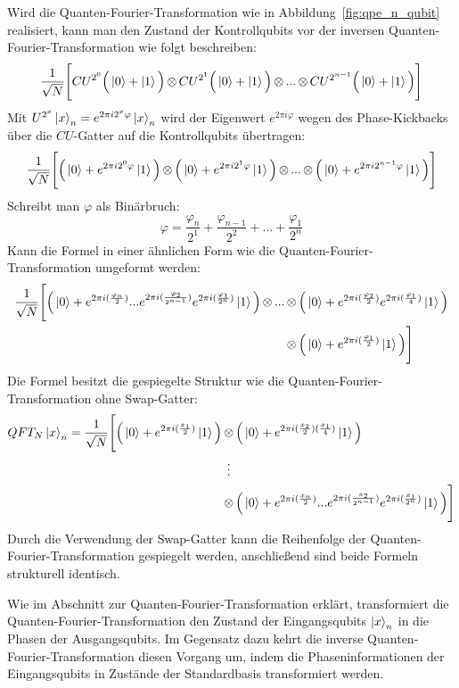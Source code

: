 Wird die Quanten-Fourier-Transformation wie in Abbildung~\ref{fig:qpe_n_qubit} realisiert,
kann man den Zustand der Kontrollqubits vor der inversen Quanten-Fourier-Transformation wie folgt beschreiben:
\[\frac{1}{\sqrt{N}}\Bigg[
  CU^{2^0}\Big(\ket{0} + \ket{1}\Big) \operatorname{\otimes}
  CU^{2^1}\Big(\ket{0} + \ket{1}\Big) \operatorname{\otimes} 
  ... \operatorname{\otimes}
  CU^{2^{n-1}}\Big(\ket{0} + \ket{1}\Big) 
  \Bigg]\]
Mit \(U^{2^x}\ket{x}_n=e^{2\pi i 2^x\varphi}\ket{x}_n\) wird der Eigenwert \(e^{2\pi i \varphi}\) wegen des Phase-Kickbacks
über die \(CU\)-Gatter auf die Kontrollqubits übertragen:
\[\frac{1}{\sqrt{N}}\Bigg[
  \Big(\ket{0} + e^{2\pi i 2^0 \varphi}\ket{1}\Big) \operatorname{\otimes}
  \Big(\ket{0} + e^{2\pi i 2^1 \varphi}\ket{1}\Big) \operatorname{\otimes} 
  ... \operatorname{\otimes}
  \Big(\ket{0} + e^{2\pi i 2^{n-1} \varphi}\ket{1}\Big) 
  \Bigg]\]
Schreibt man \(\varphi\) als Binärbruch:
\[\varphi = \frac{\varphi_n}{2^1} + \frac{\varphi_{n-1}}{2^2} + ... + \frac{\varphi_1}{2^n}\]
Kann die Formel in einer ähnlichen Form wie die Quanten-Fourier-Transformation umgeformt werden:
\begin{align*}
\frac{1}{\sqrt{N}}\Bigg[
  \Big(\ket{0} + e^{2\pi i (\frac{\varphi_n}{2})} 
  ...  
  e^{2\pi i (\frac{\varphi_2}{2^{n-1}})}e^{2\pi i (\frac{\varphi_1}{2^{n}})}\ket{1}\Big) 
  \operatorname{\otimes} ... 
  &\operatorname{\otimes}
  \Big(\ket{0} +  e^{2\pi i (\frac{\varphi_2}{2})}e^{2\pi i (\frac{\varphi_1}{4})}\ket{1}\Big)\\ 
  &\operatorname{\otimes} 
  \Big(\ket{0} + e^{2\pi i (\frac{\varphi_1}{2})}\ket{1}\Big) 
  \Bigg]
\end{align*}
Die Formel besitzt die gespiegelte Struktur wie die Quanten-Fourier-Transformation ohne Swap-Gatter:
\begin{align*}
  QFT_{N}\ket{x}_{n} = 
  \frac{1}{\sqrt{N}}
  \Bigg[
    \Big(\ket{0} + { e^{2 \pi i (\frac{x_1}{2})}}\ket{1}\Big) 
    &\tensor
    \Big( \ket{0} + { e^{2 \pi i (\frac{x_2}{2})(\frac{x_1}{4})}}\ket{1}\Big)\\
    &\vdotswithin{\tensor}\\
    &\tensor
    \Big(\ket{0} + e^{2\pi i (\frac{x_n}{2})} ... e^{2\pi i (\frac{x_2}{2^{n-1}})}e^{2\pi i (\frac{x_1}{2^{n}})}\ket{1}\Big)
  \Bigg]
\end{align*}
Durch die Verwendung der Swap-Gatter kann die Reihenfolge der Quanten-Fourier-Transformation gespiegelt werden, 
anschließend sind beide Formeln strukturell identisch.

Wie im Abschnitt zur Quanten-Fourier-Transformation erklärt,
transformiert die Quanten-Fourier-Transformation den Zustand der Eingangsqubits \(\ket{x}_n\) in die Phasen der Ausgangsqubits.
Im Gegensatz dazu kehrt die inverse Quanten-Fourier-Transformation diesen Vorgang um, 
indem die Phaseninformationen der Eingangsqubits in Zustände der Standardbasis transformiert werden.

